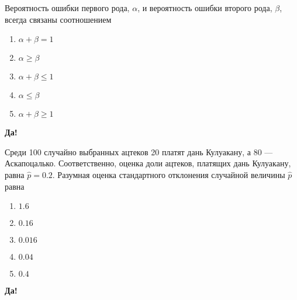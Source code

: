 \documentclass[t]{beamer}
\begin{document}
 \begin{frame} \label{27-Yes} 
\begin{block}{27} 

Вероятность ошибки первого рода, $\alpha$, и вероятность ошибки второго рода, $\beta$, всегда связаны соотношением
 


 \end{block} 
\begin{enumerate} 
\item[] \hyperlink{27-No}{\beamergotobutton{} $\alpha+\beta=1$}
\item[] \hyperlink{27-No}{\beamergotobutton{} $\alpha\geq \beta $}
\item[] \hyperlink{27-No}{\beamergotobutton{} $\alpha+\beta \leq 1$}
\item[] \hyperlink{27-No}{\beamergotobutton{} $\alpha\leq \beta $}
\item[] \hyperlink{27-No}{\beamergotobutton{} $\alpha+\beta \geq 1$}
\end{enumerate} 

 \textbf{Да!} 
 \hyperlink{28}{}\end{frame} 


 \begin{frame} \label{28-Yes} 
\begin{block}{28} 

Среди 100 случайно выбранных ацтеков 20 платят дань Кулуакану, а 80 — Аскапоцалько. Соответственно, оценка доли ацтеков, платящих дань Кулуакану, равна $\hat{p}=0.2$. Разумная оценка стандартного отклонения случайной величины $\hat{p}$ равна
 


 \end{block} 
\begin{enumerate} 
\item[] \hyperlink{28-No}{\beamergotobutton{} $1.6$}
\item[] \hyperlink{28-No}{\beamergotobutton{} $0.16$}
\item[] \hyperlink{28-No}{\beamergotobutton{} $0.016$}
\item[] \hyperlink{28-Yes}{\beamergotobutton{} $0.04$}
\item[] \hyperlink{28-No}{\beamergotobutton{} $0.4$}
\end{enumerate} 

 \textbf{Да!} 
 \hyperlink{29}{}\end{frame} 
\end{document}
